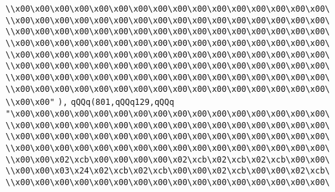 \verb|\\x00\x00\x00\x00\x00\x00\x00\x00\x00\x00\x00\x00\x00\x00\x00\x00\|\newline
\verb|\\x00\x00\x00\x00\x00\x00\x00\x00\x00\x00\x00\x00\x00\x00\x00\x00\|\newline
\verb|\\x00\x00\x00\x00\x00\x00\x00\x00\x00\x00\x00\x00\x00\x00\x00\x00\|\newline
\verb|\\x00\x00\x00\x00\x00\x00\x00\x00\x00\x00\x00\x00\x00\x00\x00\x00\|\newline
\verb|\\x00\x00\x00\x00\x00\x00\x00\x00\x00\x00\x00\x00\x00\x00\x00\x00\|\newline
\verb|\\x00\x00\x00\x00\x00\x00\x00\x00\x00\x00\x00\x00\x00\x00\x00\x00\|\newline
\verb|\\x00\x00\x00\x00\x00\x00\x00\x00\x00\x00\x00\x00\x00\x00\x00\x00\|\newline
\verb|\\x00\x00\x00\x00\x00\x00\x00\x00\x00\x00\x00\x00\x00\x00\x00\x00\|\newline
\verb|\\x00\x00"|\newline
\verb|),|\newline
\verb|qQQq(801,qQQq129,qQQq|\newline
\verb|"\x00\x00\x00\x00\x00\x00\x00\x00\x00\x00\x00\x00\x00\x00\x00\x00\|\newline
\verb|\\x00\x00\x00\x00\x00\x00\x00\x00\x00\x00\x00\x00\x00\x00\x00\x00\|\newline
\verb|\\x00\x00\x00\x00\x00\x00\x00\x00\x00\x00\x00\x00\x00\x00\x00\x00\|\newline
\verb|\\x00\x00\x00\x00\x00\x00\x00\x00\x00\x00\x00\x00\x00\x00\x00\x00\|\newline
\verb|\\x00\x00\x02\xcb\x00\x00\x00\x00\x02\xcb\x02\xcb\x02\xcb\x00\x00\|\newline
\verb|\\x00\x00\x03\x24\x02\xcb\x02\xcb\x00\x00\x02\xcb\x00\x00\x02\xcb\|\newline
\verb|\\x00\x00\x00\x00\x00\x00\x00\x00\x00\x00\x00\x00\x00\x00\x00\x00\|\newline
